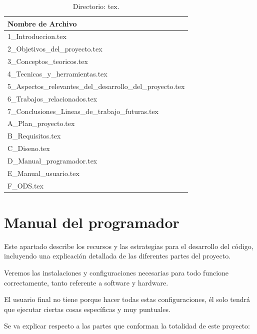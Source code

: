 \begin{table}[htbp]
\begin{center}
\caption{Directorio: tex.}
\begin{tabular}{|l|}
\hline
\rowcolor[HTML]{C0C0C0} 
\textbf{Nombre de Archivo} \\ \hline
1\_Introduccion.tex \\ \hline
2\_Objetivos\_del\_proyecto.tex \\ \hline
3\_Conceptos\_teoricos.tex \\ \hline
4\_Tecnicas\_y\_herramientas.tex \\ \hline
5\_Aspectos\_relevantes\_del\_desarrollo\_del\_proyecto.tex \\ \hline
6\_Trabajos\_relacionados.tex \\ \hline
7\_Conclusiones\_Lineas\_de\_trabajo\_futuras.tex \\ \hline
A\_Plan\_proyecto.tex \\ \hline
B\_Requisitos.tex \\ \hline
C\_Diseno.tex \\ \hline
D\_Manual\_programador.tex \\ \hline
E\_Manual\_usuario.tex \\ \hline
F\_ODS.tex \\ \hline
\end{tabular}
\end{center}
\end{table}

\section{Manual del programador}
Este apartado describe los recursos y las estrategias para el desarrollo del código, incluyendo una explicación detallada de las diferentes partes del proyecto.

Veremos las instalaciones y configuraciones necesarias para todo funcione correctamente, tanto referente a software y hardware.

El usuario final no tiene porque hacer todas estas configuraciones, él solo tendrá que ejecutar ciertas cosas específicas y muy puntuales.

Se va explicar respecto a las partes que conforman la totalidad de este proyecto:

